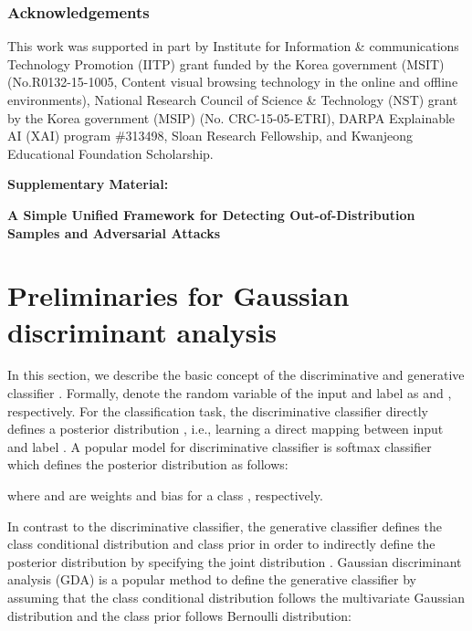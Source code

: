 \documentclass{article}
\begin{document}
\subsubsection*{Acknowledgements} 
This work was supported in part by Institute for Information \& communications Technology Promotion (IITP) grant funded by the Korea government (MSIT) (No.R0132-15-1005, Content visual browsing technology in the online and offline environments), National Research Council of Science \& Technology (NST) grant by the Korea government (MSIP) (No. CRC-15-05-ETRI), DARPA Explainable AI (XAI) program \#313498, Sloan Research Fellowship, and Kwanjeong Educational Foundation Scholarship.




\appendix


\onecolumn
\clearpage
\begin{center}{\bf {\LARGE Supplementary Material:}}
\end{center}
\begin{center}{\bf {\Large A Simple Unified Framework for Detecting Out-of-Distribution Samples and Adversarial Attacks}}
\end{center}

\section{Preliminaries for Gaussian discriminant analysis} \label{sec:preliminaries}

In this section, we describe the basic concept of the discriminative and generative classifier \citep{murphy2012machine}.
Formally, denote the random variable of the input and label as  and , respectively.
For the classification task,
the discriminative classifier directly defines a posterior distribution , i.e., learning a direct mapping between input  and label . A popular model for discriminative classifier is softmax classifier which defines the posterior distribution as follows:
 
where  and  are weights and bias for a class , respectively. 
\iffalse
\textcolor{blue}{
We remark that the softmax classifier with DNNs has become a standard in various classification tasks \citep{he2016deep, amodei2016deep} since it shows the state-of-the-art performance.}
\fi
In contrast to the discriminative classifier, the generative classifier defines the class conditional distribution  and class prior  in order to indirectly define the posterior distribution by specifying the joint distribution .
Gaussian discriminant analysis (GDA) is a popular method to define the generative classifier by assuming that
the class conditional distribution follows the multivariate Gaussian distribution and the class prior follows Bernoulli distribution:
\end{document}
